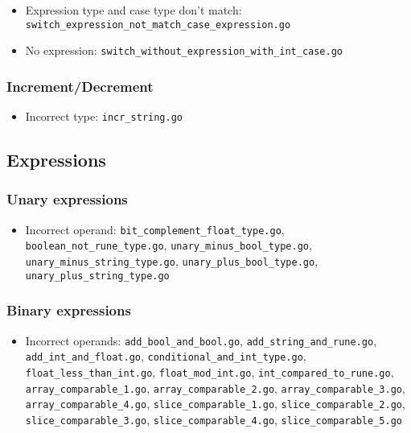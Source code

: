 \documentclass{article}
\begin{document}
\begin{itemize}
\item Expression type and case type don't match: \texttt{switch\_expression\_not\_match\_case\_expression.go}
\item No expression: \texttt{switch\_without\_expression\_with\_int\_case.go}
\end{itemize}

\subsubsection{Increment/Decrement}

\begin{itemize}
\item Incorrect type: \texttt{incr\_string.go}
\end{itemize}

\subsection{Expressions}

\subsubsection{Unary expressions}

\begin{itemize}
\item Incorrect operand: \texttt{bit\_complement\_float\_type.go}, \texttt{boolean\_not\_rune\_type.go}, \texttt{unary\_minus\_bool\_type.go}, \texttt{unary\_minus\_string\_type.go}, \texttt{unary\_plus\_bool\_type.go}, \texttt{unary\_plus\_string\_type.go}
\end{itemize}

\subsubsection{Binary expressions}

\begin{itemize}
\item Incorrect operands: \texttt{add\_bool\_and\_bool.go}, \texttt{add\_string\_and\_rune.go}, \texttt{add\_int\_and\_float.go}, \texttt{conditional\_and\_int\_type.go}, \texttt{float\_less\_than\_int.go}, \texttt{float\_mod\_int.go}, \texttt{int\_compared\_to\_rune.go}, \texttt{array\_comparable\_1.go}, \texttt{array\_comparable\_2.go}, \texttt{array\_comparable\_3.go}, \texttt{array\_comparable\_4.go}, \texttt{slice\_comparable\_1.go}, \texttt{slice\_comparable\_2.go}, \texttt{slice\_comparable\_3.go}, \texttt{slice\_comparable\_4.go}, \texttt{slice\_comparable\_5.go}
\end{itemize}
\end{document}
